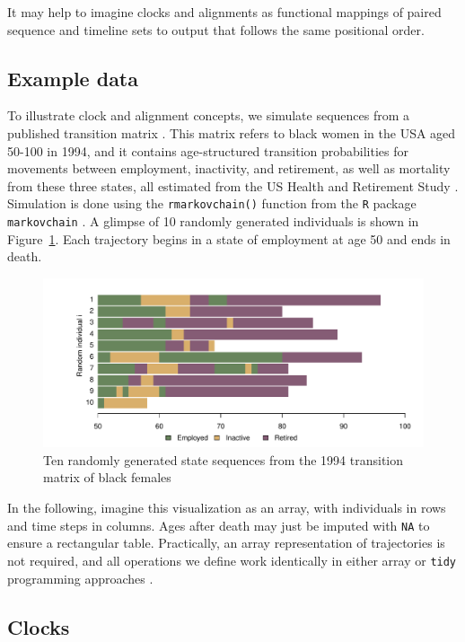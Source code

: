 \documentclass[a4paper,left=1.25cm,right=1.25cm,top=1.25cm,bottom=1.25cm]{article}
\begin{document}
It may help to imagine clocks and alignments as functional mappings of paired sequence and timeline sets to output that follows the same positional order.

\subsection{Example data}
To illustrate clock and alignment concepts, we simulate sequences from a published transition matrix \citep{Dudel2017}. This matrix refers to black women in the USA aged 50-100 in 1994, and it contains age-structured transition probabilities for movements between employment, inactivity, and retirement, as well as mortality from these three states, all estimated from the US Health and Retirement Study \citep{HRS}. Simulation is done using the \texttt{rmarkovchain()} function from the \texttt{R} package \texttt{markovchain} \citep{spedicato2017}. A glimpse of 10 randomly generated individuals is shown in Figure~\ref{fig:seq10}.  Each trajectory begins in a state of employment at age 50 and ends in death.

\begin{figure}[ht!]
\centering
\includegraphics[scale=.5]{Figures/Seq10.pdf}
\caption{Ten randomly generated state sequences from the 1994 transition matrix
of black females \citep{Dudel2017}}
\label{fig:seq10}
\end{figure}

 In the following, imagine this visualization as an array, with individuals in rows and time steps in columns. Ages after death may just be imputed with \texttt{NA} to ensure a rectangular table. Practically, an array representation of trajectories is not required, and all operations we define work identically in either array or \texttt{tidy} programming approaches \citep{wickham2014tidy}.

\FloatBarrier

\subsection{Clocks}
\label{sec:clocks}
\end{document}
